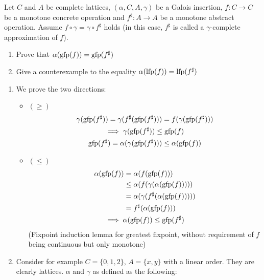 \begin{exercise}{
    Let $C$ and $A$ be complete lattices, $(\alpha, C, A, \gamma)$ be a Galois insertion, $f: C \to C$ be a monotone concrete operation and $f^\sharp: A \to A$ be a monotone abstract operation. Assume $f \circ \gamma = \gamma \circ f^\sharp$ holds (in this case, $f^\sharp$ is called a $\gamma$-complete approximation of $f$).
    \begin{enumerate}[1.]
        \item Prove that $\alpha(\operatorname{gfp}(f)) = \operatorname{gfp}(f^\sharp)$
        \item Give a counterexample to the equality $\alpha(\operatorname{lfp}(f)) = \operatorname{lfp}(f^\sharp)$
    \end{enumerate}
}
    \begin{enumerate}[1.]
        \item We prove the two directions:
        \begin{itemize}
            \item $(\geq)$
            \begin{gather*}
                \gamma(\operatorname{gfp}(f^\sharp)) = \gamma(f^\sharp (\operatorname{gfp}(f^\sharp))) = f(\gamma(\operatorname{gfp}(f^\sharp))) \\
                \implies \gamma(\operatorname{gfp}(f^\sharp)) \leq \operatorname{gfp}(f) \\
                \operatorname{gfp}(f^\sharp) = \alpha(\gamma(\operatorname{gfp}(f^\sharp))) \leq \alpha(\operatorname{gfp}(f))
            \end{gather*}
            \item $(\leq)$
            \begin{gather*}
                \begin{aligned}
                    \alpha(\operatorname{gfp}(f)) &= \alpha(f(\operatorname{gfp}(f))) \\
                    &\leq \alpha(f(\gamma(\alpha(\operatorname{gfp}(f))))) \\
                    &= \alpha(\gamma(f^\sharp(\alpha(\operatorname{gfp}(f))))) \\
                    &= f^\sharp(\alpha(\operatorname{gfp}(f)))
                \end{aligned} \\
                \implies \alpha(\operatorname{gfp}(f)) \leq \operatorname{gfp}(f^\sharp)
            \end{gather*}
            (Fixpoint induction lemma for greatest fixpoint, without requirement of $f$ being continuous but only monotone)
        \end{itemize}
        \item Consider for example $C = \{0, 1, 2\}$, $A = \{x, y\}$ with a linear order. They are clearly lattices. $\alpha$ and $\gamma$ as defined as the following:

\end{enumerate}
\end{exercise}
